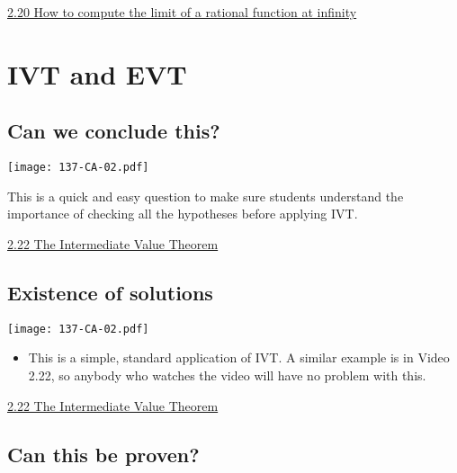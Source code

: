 \documentclass[11pt]{article}
\newcommand{\n}{\newpage}
\newcommand{\nl}{\hfill \vspace{-1.1\baselineskip}} %
\newcommand{\vxx}{\hspace{8mm} \href{https://www.youtube.com/watch?v=odRR5XVqHe8&list=PLlwePzQY_wW8P_I8BFgm0-upywEwTKd8_&index=20}{2.20 How to compute the limit of a rational function at infinity}}
\newcommand{\vxxii}{\hspace{8mm} \href{https://www.youtube.com/watch?v=ncR9x7p6LaU&list=PLlwePzQY_wW8P_I8BFgm0-upywEwTKd8_&index=22}{2.22 The Intermediate Value Theorem}}
\begin{document}
\begin{videos}
\vxx
\end{videos}

\n
\section{IVT and EVT}
\subsection{Can we conclude this?}

\begin{center}
{ \texttt{[image: 137-CA-02.pdf]}}
\end{center}

\begin{comments}
This is a quick and easy question to make sure students understand the importance of checking all the hypotheses before applying IVT.
\end{comments}

\begin{videos}
\vxxii
\end{videos}

\n
\subsection{Existence of solutions} 

\begin{center}
{ \texttt{[image: 137-CA-02.pdf]}}
\end{center}

\begin{comments}
\nl
	\begin{itemize}
		\item  This is a simple, standard application of IVT.  A similar example is in Video 2.22, so anybody who watches the video will have no problem with this.
	\end{itemize}
\end{comments}

\begin{videos}
\vxxii
\end{videos}

\n
\newpage
\subsection{Can this be proven?} 
\end{document}

